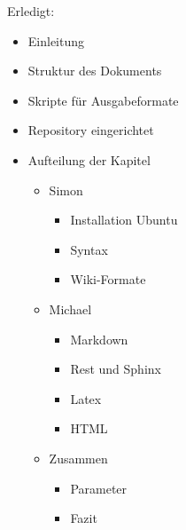\documentclass[%
oneside,                 %
final,                   %
chapterprefix=true,      %
open=right,              %
10pt]{book}
\newcommand{\clearemptydoublepage}{\clearpage{\pagestyle{empty}\cleardoublepage}}
\begin{document}
\noindent
Erledigt:
\begin{itemize}
\item Einleitung

\item Struktur des Dokuments

\item Skripte für Ausgabeformate

\item Repository eingerichtet

\item Aufteilung der Kapitel
\begin{itemize}

 \item Simon
\begin{itemize}

  \item Installation Ubuntu

  \item Syntax

  \item Wiki-Formate

\end{itemize}

\noindent
 \item Michael
\begin{itemize}

  \item Markdown

  \item Rest und Sphinx

  \item Latex

  \item HTML

\end{itemize}

\noindent
 \item Zusammen
\begin{itemize}

  \item Parameter

  \item Fazit  
\end{itemize}

\noindent
\end{itemize}

\noindent
\end{itemize}

\noindent



\clearemptydoublepage
{}
\thispagestyle{empty}
\printindex
\end{document}
